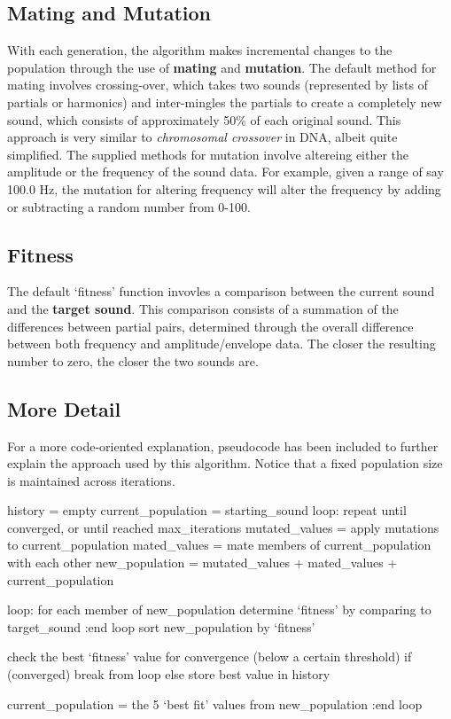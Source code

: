 \documentclass[11pt]{article}
\begin{document}
\subsection{Mating and Mutation}
With each generation, the algorithm makes incremental changes to the population through the use of {\bf mating} and {\bf mutation}. 
The default method for mating involves crossing-over, which takes two sounds (represented by lists of partials or harmonics) and inter-mingles the partials to create a completely new sound, which consists of approximately 50\% of each original sound. This approach is very similar to \emph{chromosomal crossover} in DNA, albeit quite simplified.
The supplied methods for mutation involve altereing either the amplitude or the frequency of the sound data. For example, given a range of say 100.0 Hz, the mutation for altering frequency will alter the frequency by adding or subtracting a random number from 0-100.
\subsection{Fitness}
The default `fitness' function invovles a comparison between the current sound and the {\bf target sound}. This comparison consists of a summation of the differences between partial pairs, determined through the overall difference between both frequency and amplitude/envelope data. The closer the resulting number to zero, the closer the two sounds are.
\subsection{More Detail}
For a more code-oriented explanation, pseudocode has been included to further explain the approach used by this algorithm. Notice that a fixed population size is maintained across iterations.
\begin{code}
history = empty
current_population = starting_sound
loop: repeat until converged, or until reached max_iterations
  mutated_values = apply mutations to current_population
  mated_values   = mate members of current_population with each other
  new_population = mutated_values + mated_values + current_population
  
  loop: for each member of new_population
    determine `fitness' by comparing to target_sound
  :end loop
  sort new_population by `fitness'
  
  check the best `fitness' value for convergence (below a certain threshold)
  if (converged)
    break from loop
  else
    store best value in history
  
  current_population = the 5 `best fit' values from new_population
:end loop
\end{code}
 
\end{document}
